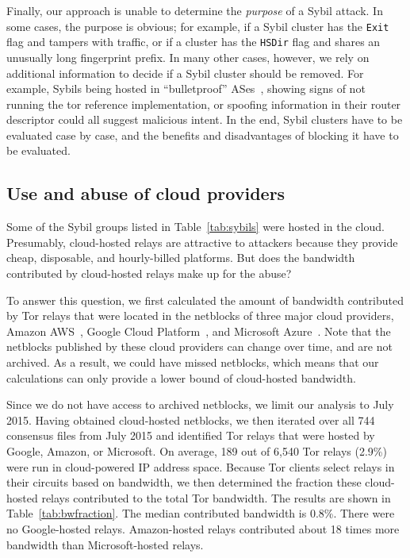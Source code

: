 Finally, our approach is unable to determine the \emph{purpose} of a Sybil
attack.  In some cases, the purpose is obvious; for example, if a Sybil cluster
has the \texttt{Exit} flag and tampers with traffic, or if a cluster has the
\texttt{HSDir} flag and shares an unusually long fingerprint prefix.  In many
other cases, however, we rely on additional information to decide if a Sybil
cluster should be removed.  For example, Sybils being hosted in ``bulletproof''
ASes~\cite{Konte2015a}, showing signs of not running the tor reference
implementation, or spoofing information in their router descriptor could all
suggest malicious intent.  In the end, Sybil clusters have to be evaluated case
by case, and the benefits and disadvantages of blocking it have to be evaluated.


\subsection{Use and abuse of cloud providers}
\label{sec:cloud}
Some of the Sybil groups listed in Table~\ref{tab:sybils} were hosted in the
cloud.  Presumably, cloud-hosted relays are attractive to attackers because they
provide cheap, disposable, and hourly-billed platforms.  But does the bandwidth
contributed by cloud-hosted relays make up for the abuse?

To answer this question, we first calculated the amount of bandwidth contributed
by Tor relays that were located in the netblocks of three major cloud providers,
Amazon AWS~\cite{amazonaws}, Google Cloud Platform~\cite{googlecloud}, and
Microsoft Azure~\cite{azure}.  Note that the netblocks published by these cloud
providers can change over time, and are not archived.  As a result, we could
have missed netblocks, which means that our calculations can only provide a
lower bound of cloud-hosted bandwidth.

Since we do not have access to archived netblocks, we limit our analysis to
July 2015.  Having obtained cloud-hosted netblocks, we then iterated over all
744 consensus files from July 2015 and identified Tor relays that were hosted
by Google, Amazon, or Microsoft.  On average, 189 out of 6,540 Tor relays
(2.9\%) were run in cloud-powered IP address space.  Because Tor
clients select relays in their circuits based on bandwidth, we then determined
the fraction these cloud-hosted relays contributed to the total Tor bandwidth.
The results are shown in Table~\ref{tab:bwfraction}.  The median contributed
bandwidth is 0.8\%.  There were no Google-hosted relays.  Amazon-hosted relays
contributed about 18 times more bandwidth than Microsoft-hosted relays.

